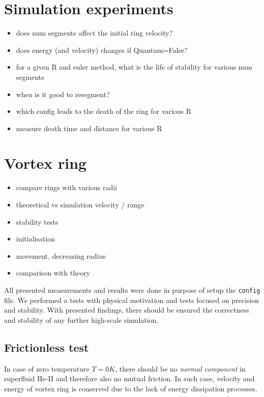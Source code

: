 \section{Simulation experiments}
\begin{itemize}
	\item does num segments affect the initial ring velocity?
	\item does energy (and velocity) changes if Quantum=False?
	\item for a given R and euler method, what is the life of stability for various num segments
	\item when is it good to resegment?
	\item which config leads to the death of the ring for various R
	\item measure death time and distance for various R

\end{itemize}

\section{Vortex ring}
\begin{itemize}
	\item compare rings with various radii
	\item theoretical vs simulation velocity / range
	\item stability tests
	\item initialisation
	\item movement, decreasing radius
	\item comparison with theory
\end{itemize}

All presented measurements and results were done in purpose of setup the \texttt{config} file. We performed a tests with physical motivation and tests focused on precision and stability. With presented findings, there should be ensured the correctness and stability of any further high-scale simulation.

\subsection*{Frictionless test}

In case of zero temperature $T=0\unit{K}$, there should be no \textit{normal component} in superfluid He-II and therefore also no mutual friction. In such case, velocity and energy of vortex ring is conserved due to the lack of energy dissipation processes.

